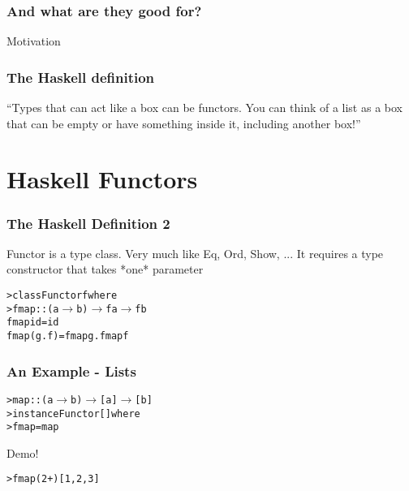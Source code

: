\documentclass[12pt, xcolor=table]{beamer}
\begin{document}
\begin{frame}
    \frametitle{And what are they good for?}
    Motivation

\end{frame}

\begin{frame}
    \frametitle{The Haskell definition}
    ``Types that can act like a box can be functors. You can think of a list as a box that can be empty or have something inside it, including another box!''
\end{frame}

\section{Haskell Functors}
\begin{frame}
    \frametitle{The Haskell Definition 2}
    Functor is a type class. Very much like Eq, Ord, Show, ...
    It requires a type constructor that takes *one* parameter

    \begin{alltt}
        > class  Functor    f   where \\
        >       fmap         ::   (a $\to$ b) $\to$ f a $\to$ f b
               \newline
               \newline
        fmap id           =  id \\
        fmap (g . f)      =  fmap g . fmap f
    \end{alltt}
\end{frame}

\begin{frame}
    \frametitle{An Example - Lists}

    \begin{alltt}
        > map :: (a $\to$ b) $\to$ [a] $\to$ [b] \\
        > instance Functor [] where \\
        >   fmap = map
    \end{alltt}

    \begin{block}{Demo!}
        \begin{alltt}
            > fmap (2 +) [1,2,3]
        \end{alltt}
    \end{block}
\end{frame}
\end{document}
